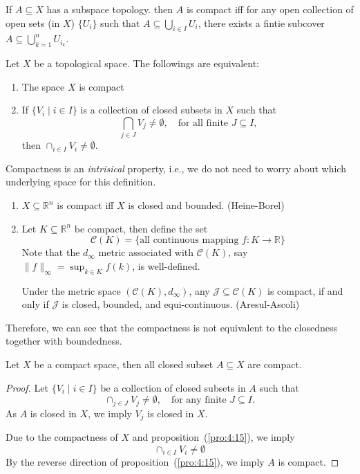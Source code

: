 \begin{remark}
If $A\subseteq X$ has a subspace topology. then $A$ is compact iff 
for any open collection of open sets (in $X$) $\{U_i\}$ such that $A\subseteq\bigcup_{i\in I}U_i$, 
there exists a fintie subcover $A\subseteq\bigcup_{k=1}^nU_{i_k}$.
\end{remark}

\begin{proposition}\label{pro:4:15}
Let $X$ be a topological space.
The followings are equivalent:
\begin{enumerate}
\item
The space $X$ is compact
\item
If $\{V_i\mid i\in I\}$ is a collection of closed subsets in $X$ such that
\[
\bigcap_{j\in J}V_j\ne\emptyset,\quad \text{for all finite $J\subseteq I$,}
\]
then $\cap_{i\in I}V_i\ne\emptyset$.
\end{enumerate}
\end{proposition}
Compactness is an \emph{intrisical} property, i.e., we do not need to worry about which underlying space for this definition.
\begin{example}
\begin{enumerate}
\item
$X\subseteq\mathbb{R}^n$ is compact iff $X$ is closed and bounded. (Heine-Borel)
\item
Let $K\subseteq\mathbb{R}^n$ be compact, then define the set
\[
\mathcal{C}(K)=\{\text{all continuous mapping }f:K\to\mathbb{R}\}
\]
Note that the $d_\infty$ metric associated with $\mathcal{C}(K)$, say $\|f\|_\infty=\sup_{k\in K}f(k)$, is well-defined.

Under the metric space $(\mathcal{C}(K),d_\infty)$, any $\mathcal{J}\subseteq\mathcal{C}(K)$ is compact, if and only if $\mathcal{J}$ is closed, bounded, and equi-continuous. (Aresul-Ascoli)
\end{enumerate}
Therefore, we can see that the compactness is not equivalent to the closedness together with boundedness.
\end{example}

\begin{proposition}\label{pro:4:16}
Let $X$ be a compact space, then all closed subset $A\subseteq X$ are compact.
\end{proposition}
\begin{proof}
Let $\{V_i\mid i\in I\}$ be a collection of closed subsets in $A$ such that 
\[
\cap_{j\in J}V_j\ne\emptyset,\quad\text{for any finite $J\subseteq I$.}
\]
As $A$ is closed in $X$, we imply $V_j$ is closed in $X$.

Due to the compactness of $X$ and proposition~(\ref{pro:4:15}), we imply
\[
\cap_{i\in I}V_i\ne\emptyset
\]
By the reverse direction of proposition~(\ref{pro:4:15}), we imply $A$ is compact.
\end{proof}

